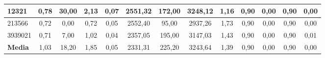 \documentclass[12pt, spanish]{article}
\begin{document}
\begin{table}[H]
\begin{adjustwidth}{-1cm}{-1cm}
\begin{tabular}{|l|c|c|c|c|c|c|c|c|c|c|c|c|}
12321                                                   & 0,78                         & 30,00                          & 2,13                      & 0,07                   & 2551,32                      & 172,00                         & 3248,12                   & 1,16                   & 0,90                         & 0,00                           & 0,90                      & 0,00                   \\ \hline
213566                                                  & 0,72                         & 0,00                           & 0,72                      & 0,05                   & 2552,40                      & 95,00                          & 2937,26                   & 1,73                   & 0,90                         & 0,00                           & 0,90                      & 0,00                   \\ \hline
3939021                                                 & 0,71                         & 7,00                           & 1,02                      & 0,04                   & 2357,05                      & 195,00                         & 3147,03                   & 1,43                   & 0,90                         & 0,00                           & 0,90                      & 0,01                   \\ \hline
\textbf{Media}                                          & 1,03                         & 18,20                          & 1,85                      & 0,05                   & 2331,31                      & 225,20                         & 3243,64                   & 1,39                   & 0,90                         & 0,00                           & 0,90                      & 0,00                   \\ \hline
\end{tabular}

\end{adjustwidth}

\end{table}
\end{document}
